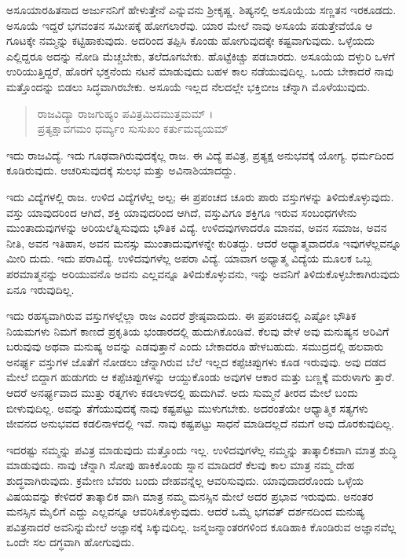ಅಸೂಯಾರಹಿತನಾದ ಅರ್ಜುನನಿಗೆ ಹೇಳುತ್ತೇನೆ ಎನ್ನುವನು ಶ್ರೀಕೃಷ್ಣ. ಶಿಷ್ಯನಲ್ಲಿ ಅಸೂಯೆಯ ಸಣ್ಣತನ ಇರಕೂಡದು. ಅಸೂಯೆ ಇದ್ದರೆ ಭಗವಂತನ ಸಮೀಪಕ್ಕೆ ಹೋಗಲಾರೆವು. ಯಾರ ಮೇಲೆ ನಾವು ಅಸೂಯೆ ಪಡುತ್ತೇವೆಯೊ ಆ ಗೂಟಕ್ಕೇ ನಮ್ಮನ್ನು ಕಟ್ಟಿಹಾಕುವುದು. ಅದರಿಂದ ತಪ್ಪಿಸಿ ಕೊಂಡು ಹೋಗುವುದಕ್ಕೇ ಕಷ್ಟವಾಗುವುದು. ಒಳ್ಳೆಯದು ಎಲ್ಲಿದ್ದರೂ ಅದನ್ನು ನೋಡಿ ಮೆಚ್ಚಬೇಕು, ತಲೆದೂಗಬೇಕು. ಹೊಟ್ಟೆಕಿಚ್ಚು ಪಡಬಾರದು. ಅಸೂಯೆಯ ದಳ್ಳುರಿ ಒಳಗೆ ಉರಿಯುತ್ತಿದ್ದರೆ, ಹೊರಗೆ ಭಕ್ತನೆಂದು ನಟನೆ ಮಾಡುವುದು ಬಹಳ ಕಾಲ ನಡೆಯುವುದಿಲ್ಲ. ಒಂದು ಬೇಕಾದರೆ ನಾವು ಮತ್ತೊಂದನ್ನು ಬಿಡಲು ಸಿದ್ಧವಾಗಿರಬೇಕು. ಅಸೂಯೆ ಇಲ್ಲದ ನೆಲದಲ್ಲೇ ಭಕ್ತಿಬೀಜ ಚೆನ್ನಾಗಿ ಮೊಳೆಯುವುದು.

\begin{verse}
ರಾಜವಿದ್ಯಾ ರಾಜಗುಹ್ಯಂ ಪವಿತ್ರಮಿದಮುತ್ತಮಮ್ ।\\ಪ್ರತ್ಯಕ್ಷಾವಗಮಂ ಧರ್ಮ್ಯಂ ಸುಸುಖಂ ಕರ್ತುಮವ್ಯಯಮ್ 
\end{verse}

{\small ಇದು ರಾಜವಿದ್ಯೆ. ಇದು ಗೂಢವಾಗಿರುವುದಕ್ಕೆಲ್ಲ ರಾಜ. ಈ ವಿದ್ಯೆ ಪವಿತ್ರ, ಪ್ರತ್ಯಕ್ಷ ಅನುಭವಕ್ಕೆ ಯೋಗ್ಯ. ಧರ್ಮದಿಂದ ಕೂಡಿರುವುದು. ಆಚರಿಸುವುದಕ್ಕೆ ಸುಲಭ ಮತ್ತು ಅವಿನಾಶಿಯಾದದ್ದು.}

ಇದು ವಿದ್ಯೆಗಳಲ್ಲಿ ರಾಜ. ಉಳಿದ ವಿದ್ಯೆಗಳೆಲ್ಲ ಅಲ್ಪ; ಈ ಪ್ರಪಂಚದ ಚೂರು ಪಾರು ವಸ್ತುಗಳನ್ನು ತಿಳಿದುಕೊಳ್ಳುವುದು. ವಸ್ತು ಯಾವುದರಿಂದ ಆಗಿದೆ, ಶಕ್ತಿ ಯಾವುದರಿಂದ ಆಗಿದೆ, ವಸ್ತುವಿಗೂ ಶಕ್ತಿಗೂ ಇರುವ ಸಂಬಂಧಗಳೇನು ಮುಂತಾದುವುಗಳನ್ನು ಅರಿಯಲೆತ್ನಿಸುವುದು ಭೌತಿಕ ವಿದ್ಯೆ. ಉಳಿದವುಗಳಾದರೊ ಮಾನವ, ಅವನ ಸಮಾಜ, ಅವನ ನೀತಿ, ಅವನ ಇತಿಹಾಸ, ಅವನ ಮನಸ್ಸು ಮುಂತಾದುವುಗಳನ್ನೇ ಕುರಿತದ್ದು. ಆದರೆ ಅಧ್ಯಾತ್ಮವಾದರೊ ಇವುಗಳೆಲ್ಲವನ್ನೂ ಮೀರಿ ದುದು. ಇದು ಪರಾವಿದ್ಯೆ. ಉಳಿದವುಗಳೆಲ್ಲ ಅಪರಾ ವಿದ್ಯೆ. ಯಾವಾಗ ಅಧ್ಯಾತ್ಮ ವಿದ್ಯೆಯ ಮೂಲಕ ಒಬ್ಬ ಪರಮಾತ್ಮನನ್ನು ಅರಿಯುವನೊ ಅವನು ಎಲ್ಲವನ್ನೂ ತಿಳಿದುಕೊಳ್ಳುವನು, ಇನ್ನು ಅವನಿಗೆ ತಿಳಿದುಕೊಳ್ಳಬೇಕಾಗಿರುವುದು ಏನೂ ಇರುವುದಿಲ್ಲ.

ಇದು ರಹಸ್ಯವಾಗಿರುವ ವಸ್ತುಗಳಲ್ಲೆಲ್ಲಾ ರಾಜ ಎಂದರೆ ಶ್ರೇಷ್ಠವಾದುದು. ಈ ಪ್ರಪಂಚದಲ್ಲಿ ಎಷ್ಟೋ ಭೌತಿಕ ನಿಯಮಗಳು ನಿಮಗೆ ಕಾಣದೆ ಪ್ರಕೃತಿಯ ಭಂಡಾರದಲ್ಲಿ ಹುದುಗಿಕೊಂಡಿವೆ. ಕೆಲವು ವೇಳೆ ಅವು ಮನುಷ್ಯನ ಅರಿವಿಗೆ ಬರುವುವು ಅಥವಾ ಮನುಷ್ಯ ಅವನ್ನು ಎಡವುತ್ತಾನೆ ಎಂದು ಬೇಕಾದರೂ ಹೇಳಬಹುದು. ಸಮುದ್ರದಲ್ಲಿ ಹಲವಾರು ಅನರ್ಘ್ಯ ವಸ್ತುಗಳ ಜೊತೆಗೆ ನೋಡಲು ಚೆನ್ನಾಗಿರುವ ಬೆಲೆ ಇಲ್ಲದ ಕಪ್ಪೆಚಿಪ್ಪುಗಳು ಕೂಡ ಇರುವುವು. ಅವು ದಡದ ಮೇಲೆ ಬಿದ್ದಾಗ ಹುಡುಗರು ಆ ಕಪ್ಪೆಚಿಪ್ಪುಗಳನ್ನು ಆಯ್ದುಕೊಂಡು ಅವುಗಳ ಆಕಾರ ಮತ್ತು ಬಣ್ಣಕ್ಕೆ ಮರುಳಾಗು ತ್ತಾರೆ. ಆದರೆ ಅನರ್ಘ್ಯವಾದ ಮುತ್ತು ರತ್ನಗಳು ಕಡಲಾಳದಲ್ಲಿ ಹುದುಗಿವೆ. ಅದು ಸುಮ್ಮನೆ ತೀರದ ಮೇಲೆ ಬಂದು ಬೀಳುವುದಿಲ್ಲ. ಅವನ್ನು ತೆಗೆಯುವುದಕ್ಕೆ ನಾವು ಕಷ್ಟಪಟ್ಟು ಮುಳುಗಬೇಕು. ಅದರಂತೆಯೇ ಆಧ್ಯಾತ್ಮಿಕ ಸತ್ಯಗಳು ಜೀವನದ ಅನುಭವದ ಕಡಲಿನಾಳದಲ್ಲಿ ಇವೆ. ನಾವು ಕಷ್ಟಪಟ್ಟು ಸಾಧನೆ ಮಾಡಿದಲ್ಲದೆ ನಮಗೆ ಅವು ದೊರಕುವುದಿಲ್ಲ.

ಇದರಷ್ಟು ನಮ್ಮನ್ನು ಪವಿತ್ರ ಮಾಡುವುದು ಮತ್ತೊಂದು ಇಲ್ಲ. ಉಳಿದವುಗಳೆಲ್ಲ ನಮ್ಮನ್ನು ತಾತ್ಕಾಲಿಕವಾಗಿ ಮಾತ್ರ ಶುದ್ಧಿ ಮಾಡುವುದು. ನಾವು ಚೆನ್ನಾಗಿ ಸೋಪು ಹಾಕಿಕೊಂಡು ಸ್ನಾನ ಮಾಡಿದರೆ ಕೆಲವು ಕಾಲ ಮಾತ್ರ ನಮ್ಮ ದೇಹ ಶುದ್ಧವಾಗಿರುವುದು. ಕ್ರಮೇಣ ಬೆವರು ಬಂದು ದೇಹವನ್ನೆಲ್ಲ ಆವರಿಸುವುದು. ಯಾವುದಾದರೊಂದು ಒಳ್ಳೆಯ ವಿಷಯವನ್ನು ಕೇಳಿದರೆ ತಾತ್ಕಾಲಿಕ ವಾಗಿ ಮಾತ್ರ ನಮ್ಮ ಮನಸ್ಸಿನ ಮೇಲೆ ಅದರ ಪ್ರಭಾವ ಇರುವುದು. ಅನಂತರ ಮನಸ್ಸಿನ ಮೈಲಿಗೆ ಎದ್ದು ಎಲ್ಲವನ್ನೂ ಆವರಿಸಿಕೊಳ್ಳುವುದು. ಆದರೆ ಒಮ್ಮೆ ಭಗವತ್ ದರ್ಶನದಿಂದ ಮನುಷ್ಯ ಪವಿತ್ರನಾದರೆ ಅವನಿನ್ನುಮೇಲೆ ಅಜ್ಞಾನಕ್ಕೆ ಸಿಕ್ಕುವುದಿಲ್ಲ. ಜನ್ಮಜನ್ಮಾಂತರಗಳಿಂದ ಕೂಡಿಹಾಕಿ ಕೊಂಡಿರುವ ಅಜ್ಞಾನವೆಲ್ಲ ಒಂದೇ ಸಲ ದಗ್ಧವಾಗಿ ಹೋಗುವುದು.

